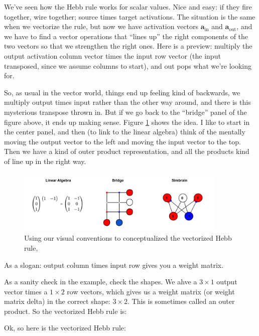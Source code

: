 We've seen how the Hebb rule works for scalar values. Nice and easy: if they fire together, wire together; source times target activations.  The situation is the same when we vectorize the rule, but now we have activation vectors $\mathbf{a}_{\text{in}}$ and $\mathbf{a}_{\text{out}}$, and we have to find a vector operations that ``lines up'' the right components of the two vectors so that we strengthen the right ones.  Here is a preview: multiply the output activation column vector times the input row vector (the input transposed, since we assume columns to start), and out pops what we're looking for. 

So, as usual in the vector world, things end up feeling kind of backwards, we multiply output times input rather than the other way around, and there is this mysterious transpose thrown in.  But if we go back to the ``bridge'' panel of the figure above, it ends up making sense. Figure \ref{vectorizedHebb} shows the idea. I like to start in the center panel, and then (to link to the linear algebra) think of the mentally moving the output vector to the left and moving the input vector to the top. Then we have a kind of outer product representation, and all the products kind of line up in the right way. 


\begin{figure}[h]
\centering
\includegraphics[width=0.9\textwidth]{images/vectorizedHebb.png}
\caption[Jeff Yoshimi.]{Using our visual conventions to conceptualized the vectorized Hebb rule,}
\label{vectorizedHebb}
\end{figure}

 As a slogan: output column times input row gives you a weight matrix.

As a sanity check in the example, check the shapes. We ahve a $3 \times 1$ output vector times a $1 \times 2$ row vectors, which gives us a weight matrix (or weight matrix delta) in the correct shape: $3 \times 2$. This is sometimes called an outer product.
So the vectorized Hebb rule is: 


Ok, so here is the vectorized Hebb rule:

